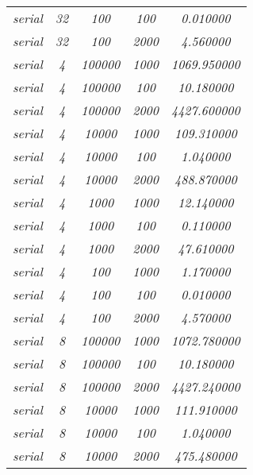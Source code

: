 \documentclass[../main.tex]{subfiles}
\begin{document}
\begin{table}[]
\begin{tabular}{|c|c|c|c|c|}
\textit{serial}  & \textit{32}      & \textit{100}    & \textit{100}  & \textit{0.010000}    \\
\textit{serial}  & \textit{32}      & \textit{100}    & \textit{2000} & \textit{4.560000}    \\
\textit{serial}  & \textit{4}       & \textit{100000} & \textit{1000} & \textit{1069.950000} \\
\textit{serial}  & \textit{4}       & \textit{100000} & \textit{100}  & \textit{10.180000}   \\
\textit{serial}  & \textit{4}       & \textit{100000} & \textit{2000} & \textit{4427.600000} \\
\textit{serial}  & \textit{4}       & \textit{10000}  & \textit{1000} & \textit{109.310000}  \\
\textit{serial}  & \textit{4}       & \textit{10000}  & \textit{100}  & \textit{1.040000}    \\
\textit{serial}  & \textit{4}       & \textit{10000}  & \textit{2000} & \textit{488.870000}  \\
\textit{serial}  & \textit{4}       & \textit{1000}   & \textit{1000} & \textit{12.140000}   \\
\textit{serial}  & \textit{4}       & \textit{1000}   & \textit{100}  & \textit{0.110000}    \\
\textit{serial}  & \textit{4}       & \textit{1000}   & \textit{2000} & \textit{47.610000}   \\
\textit{serial}  & \textit{4}       & \textit{100}    & \textit{1000} & \textit{1.170000}    \\
\textit{serial}  & \textit{4}       & \textit{100}    & \textit{100}  & \textit{0.010000}    \\
\textit{serial}  & \textit{4}       & \textit{100}    & \textit{2000} & \textit{4.570000}    \\
\textit{serial}  & \textit{8}       & \textit{100000} & \textit{1000} & \textit{1072.780000} \\
\textit{serial}  & \textit{8}       & \textit{100000} & \textit{100}  & \textit{10.180000}   \\
\textit{serial}  & \textit{8}       & \textit{100000} & \textit{2000} & \textit{4427.240000} \\
\textit{serial}  & \textit{8}       & \textit{10000}  & \textit{1000} & \textit{111.910000}  \\
\textit{serial}  & \textit{8}       & \textit{10000}  & \textit{100}  & \textit{1.040000}    \\
\textit{serial}  & \textit{8}       & \textit{10000}  & \textit{2000} & \textit{475.480000}  \\

\end{tabular}
\end{table}
\end{document}
